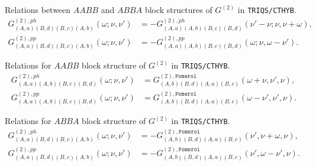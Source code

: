 \documentclass[a4paper,12pt]{article}
\newcommand{\w}{\ensuremath{\omega}}
\newcommand{\n}{\ensuremath{\nu}}
\newcommand{\pom}{\ensuremath{\mathtt{Pomerol}}}
\begin{document}
Relations between $AABB$ and $ABBA$ block structures of $G^{(2)}$  in 
\texttt{TRIQS/CTHYB}.
\begin{align}
G^{(2),ph}_{(A,a)(B,d)(B,c)(A,b)}(\w;\n,\n') &= -
G^{(2),ph}_{(A,a)(A,b)(B,c)(B,d)}(\n'-\n;\n,\n+\w),\\
G^{(2),pp}_{(A,a)(B,d)(B,c)(A,b)}(\w;\n,\n') &= -
G^{(2),pp}_{(A,a)(A,b)(B,c)(B,d)}(\w;\n,\w-\n').
\end{align}

Relations for $AABB$ block structure of $G^{(2)}$ in \texttt{TRIQS/CTHYB}.
\begin{align}
	G^{(2),ph}_{(A,a)(A,b)(B,c)(B,d)}(\w;\n,\n') &=
	G^{(2),\pom}_{(A,b)(B,d)(A,a)(B,c)}(\w+\n,\n',\n),\\
	G^{(2),pp}_{(A,a)(A,b)(B,c)(B,d)}(\w;\n,\n') &=
	G^{(2),\pom}_{(A,b)(B,d)(A,a)(B,c)}(\w-\n',\n',\n).
\end{align}

Relations for $ABBA$ block structure of $G^{(2)}$ in \texttt{TRIQS/CTHYB}.
\begin{align}
	G^{(2),ph}_{(A,a)(B,d)(B,c)(A,b)}(\w;\n,\n') &= -
	G^{(2),\pom}_{(A,b)(B,d)(A,a)(B,c)}(\n',\n+\w,\n),\\
	G^{(2),pp}_{(A,a)(B,d)(B,c)(A,b)}(\w;\n,\n') &= -
	G^{(2),\pom}_{(A,b)(B,d)(A,a)(B,c)}(\n',\w-\n',\n).
\end{align}
\end{document}
